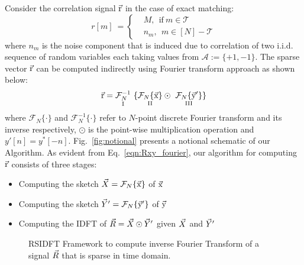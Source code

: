 Consider the correlation signal $\vec{\mathrm{r}}$ in the case of exact matching:
\begin{equation} \label{eqn:RXY_sparse}
r[m] \ = \left\{
\begin{array}{ll}
  &M,~~  \text{if} \ m \in \mathcal{T} \\
  & n_m,~~ m \in [N]-\mathcal{T}
\end{array}
\right.
\end{equation}
where $n_m$ is the noise component that is induced due to correlation of two i.i.d. sequence of random variables each taking values from $\mathcal{A} := \{+1,-1\}$. The sparse vector $\vec{\mathrm{r}}$ can be computed indirectly using Fourier transform approach as shown below:
\begin{equation}\label{eqn:Rxy_fourier}
  \rv = \underset{\text{ \RNum{1} } } {\mathcal{F}_{N}^{-1}} \ \{ \underset{\text{ \RNum{2} } }{  \mathcal{F}_{N}\{\xv\}}  \odot \ \underset{\text{ \RNum{3} } }{ \mathcal{F}_{N}\{\yv'\}}  \}
\end{equation}
where $\mathcal{F}_{N}\{ \cdot \}$ and $\mathcal{F}_{N}^{-1}\{ \cdot \}$ refer to $N$-point discrete Fourier transform and its inverse respectively, $\odot$ is the point-wise multiplication operation and ${ y'[n]} = { y^{*}[-n]}$. Fig.~\ref{fig:notional} presents a notional schematic of our Algorithm. As evident from Eq.~\eqref{eqn:Rxy_fourier}, our algorithm for computing $\vec{\mathrm{r}}$ consists of three stages:
\begin{itemize}
\item Computing the sketch $\vec{X}=\mathcal{F}_{N}\{\vec{\mathrm{x}}\}$ of $\vec{\mathrm{x}}$
\item Computing the sketch $\vec{Y}'=\mathcal{F}_{N}\{\vec{\mathrm{y}}'\}$ of $\vec{\mathrm{y}}$
\item Computing the IDFT of $\vec{R}=\vec{X} \odot \vec{Y}'$ given $\vec{X}$ and $\vec{Y}'$
\end{itemize}


	 \begin{figure}[t!]
	 	\begin{center}
	 	\resizebox{0.45\textwidth}{!}{}
	 	\end{center}	
	 	\caption{ RSIDFT Framework to compute inverse Fourier Transform of a signal $\vec{R}$ that is sparse in time domain. }\label{fig:rsidft}
	\vspace{5 pt}
	 \end{figure}


